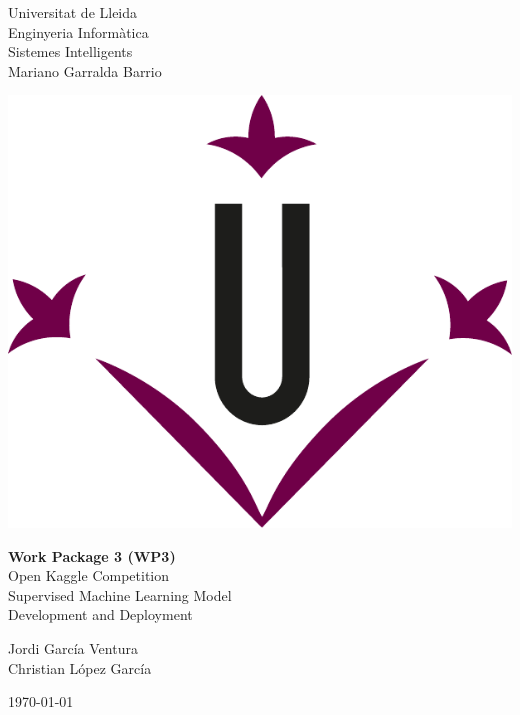 \documentclass[../main.tex]{subfiles}
\begin{document}
\begin{titlepage}
    \begin{minipage}[c]{0.4\linewidth}
    Universitat de Lleida \\
    Enginyeria Informàtica \\
    Sistemes Intel\textperiodcentered{}ligents \\
    Mariano Garralda Barrio
    \end{minipage}
    \hfill
    \begin{minipage}[c]{0.5\linewidth}
    \hfill
    \includegraphics[width=0.4\linewidth]{media/figures//udl_logo.pdf}
    \end{minipage}
        
    \vspace{5cm}

     \begin{center}
        \Huge
        \textbf{Work Package 3 (WP3)} \\ Open Kaggle Competition \\
        \vspace{1cm}
        \Large
        Supervised Machine Learning Model \\
        Development and Deployment
     \end{center}        
            
    \vspace{5cm}
        
    \begin{flushright}
        \large
        Jordi García Ventura \\
        Christian López García
    \end{flushright}
        
    \vfill
        
    \begin{center}
        \today
    \end{center}
\end{titlepage}
\end{document}
